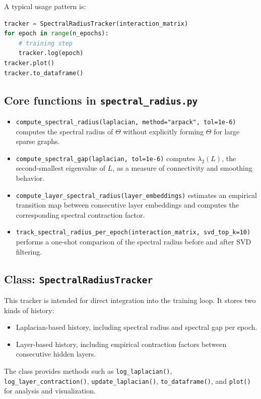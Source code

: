 \documentclass[11pt,a4paper]{article}
\begin{document}
A typical usage pattern is:
\begin{lstlisting}[language=Python]
tracker = SpectralRadiusTracker(interaction_matrix)
for epoch in range(n_epochs):
    # training step
    tracker.log(epoch)
tracker.plot()
tracker.to_dataframe()
\end{lstlisting}

\subsection{Core functions in \texttt{spectral\_radius.py}}
\begin{itemize}[leftmargin=1.5em]
\item \texttt{compute\_spectral\_radius(laplacian, method="arpack", tol=1e-6)} computes the spectral radius of \(\Theta\) without explicitly forming \(\Theta\) for large sparse graphs.
\item \texttt{compute\_spectral\_gap(laplacian, tol=1e-6)} computes \(\lambda_2(L)\), the second-smallest eigenvalue of \(L\), as a measure of connectivity and smoothing behavior.
\item \texttt{compute\_layer\_spectral\_radius(layer\_embeddings)} estimates an empirical transition map between consecutive layer embeddings and computes the corresponding spectral contraction factor.
\item \texttt{track\_spectral\_radius\_per\_epoch(interaction\_matrix, svd\_top\_k=10)} performs a one-shot comparison of the spectral radius before and after SVD filtering.
\end{itemize}

\subsection{Class: \texttt{SpectralRadiusTracker}}
This tracker is intended for direct integration into the training loop. It stores two kinds of history:
\begin{itemize}[leftmargin=1.5em]
\item Laplacian-based history, including spectral radius and spectral gap per epoch.
\item Layer-based history, including empirical contraction factors between consecutive hidden layers.
\end{itemize}

The class provides methods such as \texttt{log\_laplacian()}, \texttt{log\_layer\_contraction()}, \texttt{update\_laplacian()}, \texttt{to\_dataframe()}, and \texttt{plot()} for analysis and visualization.
\end{document}
